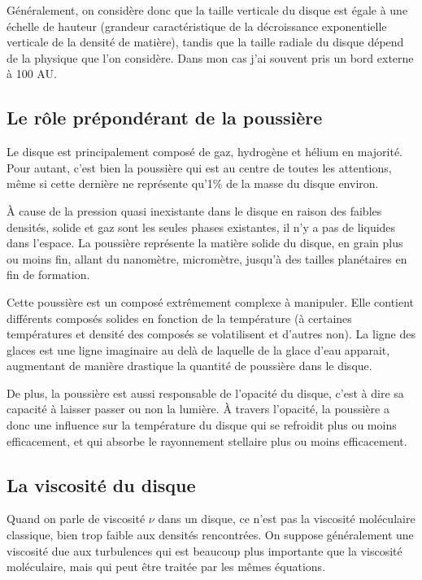 Généralement, on considère donc que la taille verticale du disque est égale à une échelle de hauteur (grandeur caractéristique de la décroissance exponentielle verticale de la densité de matière), tandis que la taille radiale du disque dépend de la physique que l'on considère. Dans mon cas j'ai souvent pris un bord externe à 100 AU.



\subsection{Le rôle prépondérant de la poussière}
Le disque est principalement composé de gaz, hydrogène et hélium en majorité. Pour autant, c'est bien la poussière qui est au centre de toutes les attentions, même si cette dernière ne représente qu'1\% de la masse du disque environ.

À cause de la pression quasi inexistante dans le disque en raison des faibles densités, solide et gaz sont les seules phases existantes, il n'y a pas de liquides dans l'espace. La poussière représente la matière solide du disque, en grain plus ou moins fin, allant du nanomètre, micromètre, jusqu'à des tailles planétaires en fin de formation. 

Cette poussière est un composé extrêmement complexe à manipuler. Elle contient différents composés solides en fonction de la température (à certaines températures et densité des composés se volatilisent et d'autres non). La ligne des glaces est une ligne imaginaire au delà de laquelle de la glace d'eau apparait, augmentant de manière drastique la quantité de poussière dans le disque. 

\bigskip

De plus, la poussière est aussi responsable de l'opacité du disque, c'est à dire sa capacité à laisser passer ou non la lumière. À travers l'opacité, la poussière a donc une influence sur la température du disque qui se refroidit plus ou moins efficacement, et qui absorbe le rayonnement stellaire plus ou moins efficacement. 

\subsection{La viscosité du disque} %
Quand on parle de viscosité $\nu$ dans un disque, ce n'est pas la viscosité moléculaire classique, bien trop faible aux densités rencontrées. On suppose généralement une viscosité due aux turbulences qui est beaucoup plus importante que la viscosité moléculaire, mais qui peut être traitée par les mêmes équations. 

